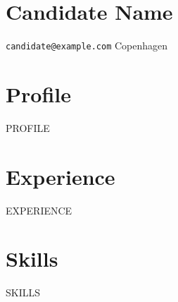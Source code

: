 \documentclass[10pt]{article}
\begin{document}
\section*{Candidate Name}
\texttt{candidate@example.com} \quad Copenhagen
\section*{Profile}
{{PROFILE}}
\section*{Experience}
{{EXPERIENCE}}
\section*{Skills}
{{SKILLS}}
\end{document}
